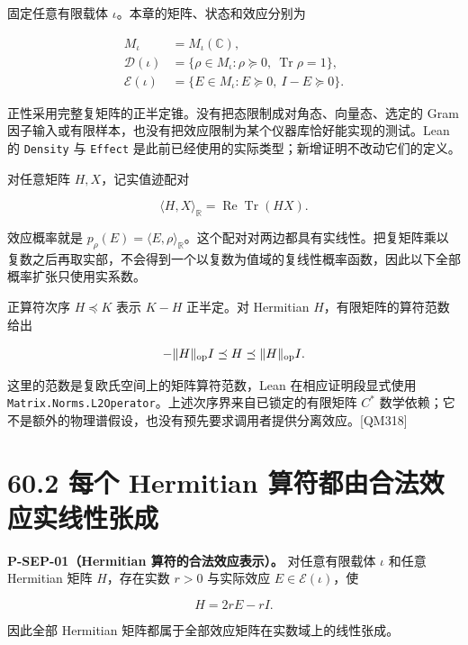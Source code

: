 \documentclass[
  11pt,
  oneside]{book}
\begin{document}
固定任意有限载体 \(\iota\)。本章的矩阵、状态和效应分别为

\[
\begin{aligned}
M_\iota&=M_\iota(\mathbb C),\\
\mathcal D(\iota)&=\{\rho\in M_\iota:\rho\succeq0,\ \operatorname{Tr}\rho=1\},\\
\mathcal E(\iota)&=\{E\in M_\iota:E\succeq0,\ I-E\succeq0\}.
\end{aligned}
\]

正性采用完整复矩阵的正半定锥。没有把态限制成对角态、向量态、选定的 Gram
因子输入或有限样本，也没有把效应限制为某个仪器库恰好能实现的测试。Lean
的 \texttt{Density} 与 \texttt{Effect}
是此前已经使用的实际类型；新增证明不改动它们的定义。

对任意矩阵 \(H,X\)，记实值迹配对

\[
\langle H,X\rangle_{\mathbb R}
=\operatorname{Re}\operatorname{Tr}(HX).
\]

效应概率就是
\(p_\rho(E)=\langle E,\rho\rangle_{\mathbb R}\)。这个配对对两边都具有实线性。把复矩阵乘以复数之后再取实部，不会得到一个以复数为值域的复线性概率函数，因此以下全部概率扩张只使用实系数。

正算符次序 \(H\preceq K\) 表示 \(K-H\) 正半定。对 Hermitian
\(H\)，有限矩阵的算符范数给出

\[
-\|H\|_{\rm op}I\preceq H\preceq\|H\|_{\rm op}I.
\]

这里的范数是复欧氏空间上的矩阵算符范数，Lean 在相应证明段显式使用
\texttt{Matrix.Norms.L2Operator}。上述次序界来自已锁定的有限矩阵 \(C^*\)
数学依赖；它不是额外的物理谱假设，也没有预先要求调用者提供分离效应。{[}QM318{]}

\hypertarget{ux6bcfux4e2a-hermitian-ux7b97ux7b26ux90fdux7531ux5408ux6cd5ux6548ux5e94ux5b9eux7ebfux6027ux5f20ux6210}{%
\section{60.2 每个 Hermitian
算符都由合法效应实线性张成}\label{ux6bcfux4e2a-hermitian-ux7b97ux7b26ux90fdux7531ux5408ux6cd5ux6548ux5e94ux5b9eux7ebfux6027ux5f20ux6210}}

\protect\hypertarget{p-sep-01}{}{}

\textbf{P-SEP-01（Hermitian 算符的合法效应表示）。} 对任意有限载体
\(\iota\) 和任意 Hermitian 矩阵 \(H\)，存在实数 \(r>0\) 与实际效应
\(E\in\mathcal E(\iota)\)，使

\[
H=2rE-rI.
\]

因此全部 Hermitian 矩阵都属于全部效应矩阵在实数域上的线性张成。
\end{document}
